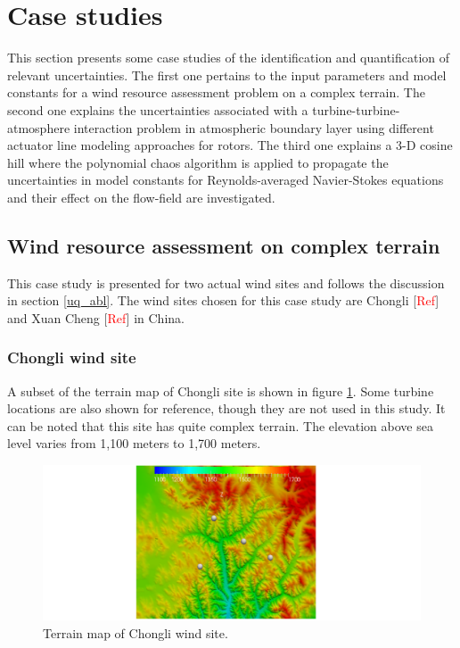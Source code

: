 \documentclass[]{aiaa-tc}%
\begin{document}
\section{Case studies} \label{case_studies}

This section presents some case studies of the identification and quantification of relevant uncertainties. The first one pertains to the input parameters and model constants for a wind resource assessment problem on a complex terrain. The second one explains the uncertainties associated with a turbine-turbine-atmosphere interaction problem in atmospheric boundary layer using different actuator line modeling approaches for rotors. The third one explains a 3-D cosine hill where the polynomial chaos algorithm is applied to propagate the uncertainties in model constants for Reynolds-averaged Navier-Stokes equations and their effect on the flow-field are investigated.

\subsection{Wind resource assessment on complex terrain} \label{case_wra}
This case study is presented for two actual wind sites and follows the discussion in section \ref{uq_abl}. The wind sites chosen for this case study are Chongli [\textcolor{red}{Ref}] and Xuan Cheng  [\textcolor{red}{Ref}] in China. 

\subsubsection{Chongli wind site} \label{Chongli}

A subset of the terrain map of Chongli site is shown in figure \ref{f:Chongli_Terrain}. Some turbine locations are also shown for reference, though they are not used in this study. It can be noted that this site has quite complex terrain. The elevation above sea level varies from 1,100 meters to 1,700 meters. 

\begin{figure}
\centering
 \includegraphics[width=1.05\textwidth]{Chongli_Terrain.png}
 \caption{Terrain map of Chongli wind site.}
 \label{f:Chongli_Terrain}
\end{figure}
\end{document}
